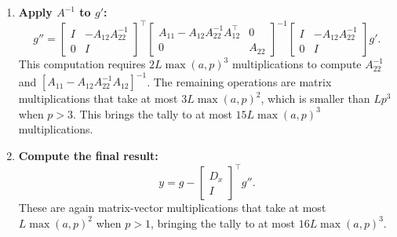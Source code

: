 \documentclass{article}
\begin{document}
\begin{enumerate}
    \item
          \textbf{Apply $A^{-1}$ to $g'$:}
          \[
              g'' =
              \begin{bmatrix}
                  I & -A_{12} A_{22}^{-1} \\ 0 & I
              \end{bmatrix}
              ^\top
              \begin{bmatrix}
                  A_{11} - A_{12} A_{22}^{-1} A_{12}^\top & 0      \\
                  0                                       & A_{22}
              \end{bmatrix}
              ^{-1}
              \begin{bmatrix}
                  I & -A_{12} A_{22}^{-1} \\ 0 & I
              \end{bmatrix}
              g'.
          \]
          This computation requires $2L\max(a,p)^3$ multiplications to compute
          $A_{22}^{-1}$ and $\left[A_{11}-A_{12} A_{22}^{-1}A_{12}\right]^{-1}$. The
          remaining operations are matrix multiplications that take at most
          $3L\max(a,p)^2$, which is smaller than $Lp^3$ when $p>3$. This brings the tally
          to at most $15L\max(a,p)^3$ multiplications.

    \item
          \textbf{Compute the final result:}
          \[
              y = g - \begin{bmatrix}
                  D_x \\ I
              \end{bmatrix}
              ^\top g''.
          \]
          These are again matrix-vector multiplications that take at most $L\max(a,p)^2$
          when $p>1$, bringing the tally to at most $16L\max(a,p)^3$.
\end{enumerate}
\end{document}
